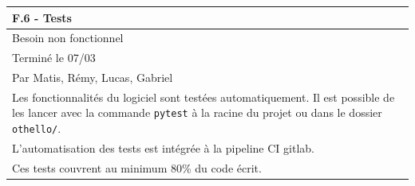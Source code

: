 \documentclass[a4paper,12pt]{article}
\begin{document}
\vspace{1cm}

\noindent
\setlength{\arrayrulewidth}{1.5pt}
\renewcommand{\arraystretch}{1.5}
\begin{tabularx}{\textwidth}{|X|}
    \hline
    \textbf{F.6 - Tests}                                                                                                                                                                     \\
    \hline
    Besoin non fonctionnel                                                                                                                                                                   \\
    \hline
    Terminé le 07/03                                                                                                                                                                         \\
    Par Matis, Rémy, Lucas, Gabriel                                                                                                                                                          \\
    \hline
    Les fonctionnalités du logiciel sont testées automatiquement. Il est possible de les lancer avec la commande \texttt{pytest} à la racine du projet ou dans le dossier \texttt{othello/}. \\
    L’automatisation des tests est intégrée à la pipeline CI gitlab.                                                                                                                         \\
    Ces tests couvrent au minimum 80\% du code écrit.                                                                                                                                        \\
    \hline
\end{tabularx}
\end{document}
